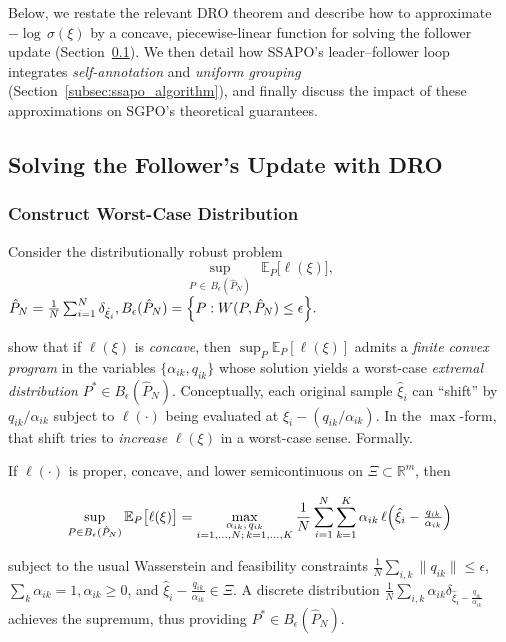 Below, we restate the relevant DRO theorem and describe how to approximate 
$-\!\log\,\sigma(\xi)$ by a concave, piecewise-linear function 
for solving the follower update (Section~\ref{subsec:follower_update}). 
We then detail how SSAPO’s leader--follower loop integrates \emph{self-annotation} and \emph{uniform grouping} (Section~\ref{subsec:ssapo_algorithm}), and finally discuss the impact of these approximations on SGPO’s theoretical guarantees.

\subsection{Solving the Follower's Update with DRO}
\label{subsec:follower_update}
\subsubsection{Construct Worst-Case Distribution}
\label{subsec:concavity_dro_theorem}

Consider the distributionally robust problem
\begin{equation*}
\label{eq:DRO_concave}
\sup_{P \,\in\, B_\epsilon(\hat{P}_N)}\,\;
\mathbb{E}_P\bigl[\ell(\xi)\bigr], 
\end{equation*}
\(\hat{P}_N = \tfrac1N \sum_{i=1}^N \delta_{\hat{\xi}_i},
B_\epsilon(\hat{P}_N)=\Bigl\{
  P : W(P,\hat{P}_N)\le \epsilon
\Bigr\}.\)

\citet{Esfahani2018Data} show that if \(\ell(\xi)\) is 
\emph{concave}, then 
\(\sup_{P} \mathbb{E}_P[\ell(\xi)]\)
admits a \emph{finite convex program} in the variables 
\(\{\alpha_{ik}, q_{ik}\}\) whose solution yields 
a worst-case \emph{extremal distribution} $P^*\in B_\epsilon(\hat{P}_N)$.  
Conceptually, each original sample \(\hat{\xi}_i\) can “shift” by $q_{ik}/\alpha_{ik}$ 
subject to $\ell(\cdot)$ being evaluated at $\hat{\xi}_i - (q_{ik}/\alpha_{ik})$.  
In the \(\max\)-form, that shift tries to \emph{increase} 
$\ell(\xi)$ in a worst-case sense. Formally.

\begin{theorem}
\label{thm:worst_case_concave}
If $\ell(\cdot)$ is proper, concave, and lower semicontinuous on $\Xi \subset \mathbb{R}^m$, 
then
\begin{tiny}
    \begin{align*}
    \sup_{P\in B_\epsilon(\hat{P}_N)}
\mathbb{E}_P\bigl[\ell(\xi)\bigr]=\max_{\substack{\alpha_{ik},\,q_{ik}\\i=1,\dots,N;\,k=1,\dots,K}}
\frac{1}{N} \sum_{i=1}^N \sum_{k=1}^K
\alpha_{ik}
\,\ell\Bigl(\hat{\xi}_i-\tfrac{q_{ik}}{\alpha_{ik}}\Bigr)
\end{align*}
\end{tiny}
subject to the usual Wasserstein and feasibility constraints
\(\tfrac{1}{N}\sum_{i,k}\|q_{ik}\|\le \epsilon\), 
\(\sum_{k}\alpha_{ik}=1, \alpha_{ik}\ge 0\), and 
\(\hat{\xi}_i-\tfrac{q_{ik}}{\alpha_{ik}}\in \Xi\).  
A discrete distribution 
\(\tfrac{1}{N}\sum_{i,k} \alpha_{ik} \delta_{\hat{\xi}_i - \tfrac{q_{ik}}{\alpha_{ik}}}\)
achieves the supremum, thus providing $P^*\in B_\epsilon(\hat{P}_N)$.
\end{theorem}

